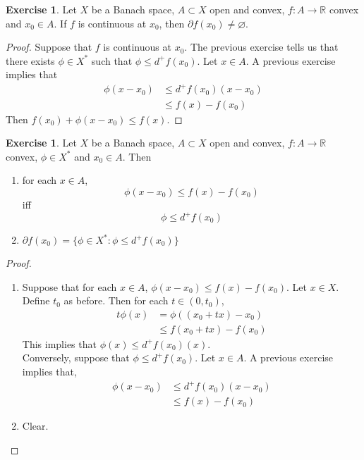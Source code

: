 \documentclass[12pt]{amsart}
\theoremstyle{definition}
\newtheorem{ex}[definition]{Exercise}
\newcommand{\R}{\mathbb{R}}
\newcommand{\p}{\partial}
\begin{document}
	\begin{ex}
	Let $X$ be a Banach space, $A \subset X$ open and convex, $f:A \rightarrow \R$ convex and $x_0 \in A$. If $f$ is continuous at $x_0$, then $\p f(x_0) \neq \varnothing$.
	\end{ex}
	
	\begin{proof}
	Suppose that $f$ is continuous at $x_0$. The previous exercise tells us that there exists $\phi \in X^*$ such that $\phi \leq d^+f(x_0)$. Let $x \in A$. A previous exercise implies that
	\begin{align*}
	\phi(x-x_0) 
	& \leq d^+f(x_0)(x - x_0) \\
	& \leq f(x) - f(x_0)
	\end{align*}
	Then $f(x_0) + \phi(x-x_0) \leq f(x)$.
	\end{proof}
	
	\begin{ex}
	Let $X$ be a Banach space, $A \subset X$ open and convex, $f:A \rightarrow \R$ convex, $\phi \in X^*$ and $x_0 \in A$. Then 
	\begin{enumerate}
	\item for each $x \in A$, $$\phi(x-x_0) \leq f(x) - f(x_0)$$ iff  $$\phi \leq d^+f(x_0)$$ 
	\item  $\p f(x_0) = \{ \phi \in X^*: \phi \leq d^+ f(x_0)\}$
	\end{enumerate}
	\end{ex}	
	
	\begin{proof}\
	\begin{enumerate}
	\item Suppose that for each $x \in A$, $\phi(x-x_0) \leq f(x) - f(x_0)$. Let $x \in X$. Define $t_0$ as before. Then for each $t \in (0, t_0)$, 
	\begin{align*}
	t\phi(x)
	&= \phi((x_0 + tx) - x_0) \\
	& \leq f(x_0 + tx) - f(x_0)
	\end{align*}	 
	This implies that $\phi(x) \leq d^+f(x_0)(x)$.\\
	Conversely, suppose that $\phi \leq d^+f(x_0)$. Let $x \in A$. A previous exercise implies that, 
	\begin{align*}
	\phi(x-x_0) 
	& \leq d^+f(x_0)(x-x_0) \\
	&\leq f(x) - f(x_0)
	\end{align*}
	\item Clear.
	\end{enumerate}
	\end{proof}
	
\end{document}
